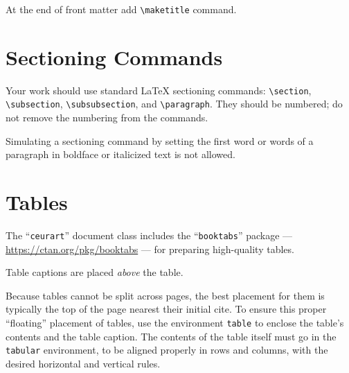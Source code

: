 \documentclass[
]{ceurart}
\begin{document}


At the end of front matter add \verb|\maketitle| command.

\section{Sectioning Commands}

Your work should use standard \LaTeX{} sectioning commands:
\verb|\section|, \verb|\subsection|,
\verb|\subsubsection|, and
\verb|\paragraph|. They should be numbered; do not remove
the numbering from the commands.

Simulating a sectioning command by setting the first word or words of
a paragraph in boldface or italicized text is not allowed.

\section{Tables}

The ``\verb|ceurart|'' document class includes the ``\verb|booktabs|''
package --- \url{https://ctan.org/pkg/booktabs} --- for preparing
high-quality tables.

Table captions are placed \textit{above} the table.

Because tables cannot be split across pages, the best placement for
them is typically the top of the page nearest their initial cite.  To
ensure this proper ``floating'' placement of tables, use the
environment \verb|table| to enclose the table's contents and the
table caption. The contents of the table itself must go in the
\verb|tabular| environment, to be aligned properly in rows and
columns, with the desired horizontal and vertical rules.
\end{document}
